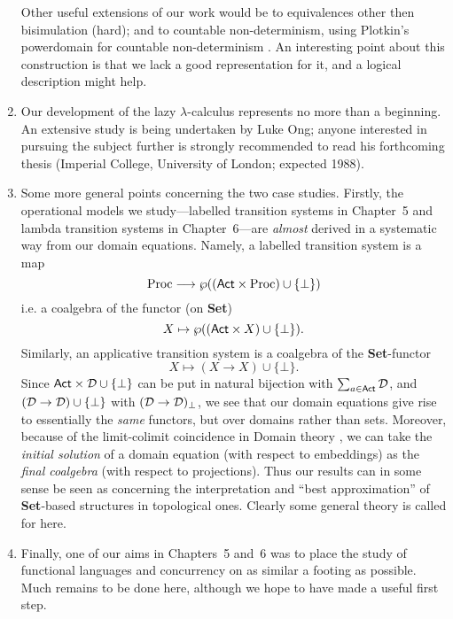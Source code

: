 \begin{enumerate}
Other useful extensions of our work would be to equivalences other then bisimulation (hard); and to countable non-determinism, using Plotkin's powerdomain for countable non-determinism \cite{Plo82}.
An interesting point about this construction is that  we lack a good representation for it, and a logical description might help.
\item Our development of the lazy $\lambda$-calculus represents no more than a beginning.
An extensive study is being undertaken by Luke Ong; anyone interested in pursuing the subject further is strongly recommended to read his forthcoming thesis 
(Imperial College, University of London; expected 1988).
\item Some more general points concerning the two case studies.
Firstly, the operational models we study---labelled transition systems in Chapter~5 and lambda transition systems in Chapter~6---are {\em almost} derived in a systematic way from our domain equations.
Namely, a labelled transition system is a map
\[ {\rm Proc} \longrightarrow \wp (({\sf Act} \times {\rm Proc} ) \cup \{ \bot \} ) \]
i.e. a coalgebra of the functor (on {\bf Set})
\[ X \mapsto \wp (({\sf Act} \times X ) \cup \{ \bot \} ) . \]
Similarly, an applicative transition system is a coalgebra of the {\bf Set}-functor
\[ X \mapsto (X \rightarrow X) \cup \{ \bot \} . \]
Since ${\sf Act} \times {\cal D} \cup \{ \bot \}$ can be put in natural 
bijection with $\sum_{a \in {\sf Act}} {\cal D}$, and $( {\cal D} \rightarrow {\cal D} ) \cup \{ \bot \}$ with $( {\cal D} \rightarrow {\cal D} )_{\bot}$, we see that our domain equations give rise to essentially the {\em same} functors, but over domains rather than sets.
Moreover, because of the limit-colimit coincidence in Domain theory \cite{SP82}, we can take the {\em initial solution} of a domain equation (with respect to embeddings) as the {\em final coalgebra} (with respect to  projections).
Thus our results can in some sense be seen as concerning the interpretation and ``best approximation'' of {\bf Set}-based structures in topological ones.
Clearly some general theory is called for here.
\item Finally, one of our aims in Chapters~5 and~6 was to place the study of functional languages and concurrency on as similar a footing as possible.
Much remains to be done here, although we hope to have made a useful first step.
\end{enumerate}

